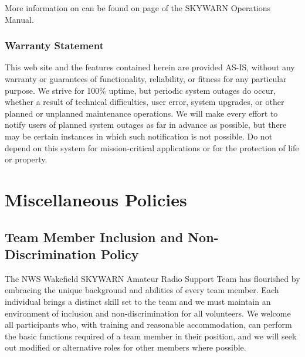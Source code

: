 \documentclass[pdflatex,letterpaper,twoside,12pt]{book}
\begin{document}
More information on  can be found on page \pageref{reporting-criteria} of the SKYWARN Operations Manual.

\subsection{Warranty Statement}

This web site and the features contained herein are provided AS-IS, without any warranty or guarantees of functionality, reliability, or fitness for any particular purpose. We strive for 100\% uptime, but periodic system outages do occur, whether a result of technical difficulties, user error, system upgrades, or other planned or unplanned maintenance operations. We will make every effort to notify users of planned system outages as far in advance as possible, but there may be certain instances in which such notification is not possible. Do not depend on this system for mission-critical applications or for the protection of life or property.


\chapter{Miscellaneous Policies}


\section{Team Member Inclusion and Non-Discrimination Policy}

The NWS Wakefield SKYWARN Amateur Radio Support Team has flourished by embracing the unique background and abilities of every team member. Each individual brings a distinct skill set to the team and we must maintain an environment of inclusion and non-discrimination for all volunteers. We welcome all participants who, with training and reasonable accommodation, can perform the basic functions required of a team member in their position, and we will seek out modified or alternative roles for other members where possible.
\end{document}
